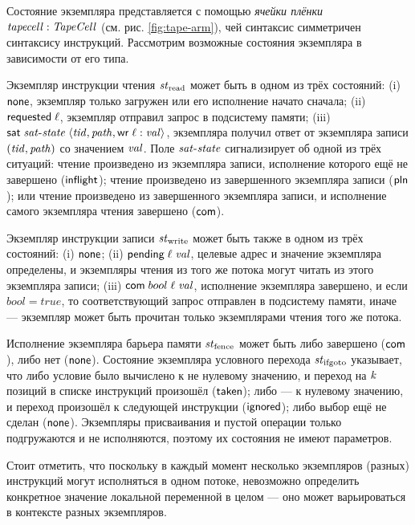 Состояние экземпляра представляется с помощью \emph{ячейки плёнки} $\mathit{tapecell}: \mathit{TapeCell}$ (см. рис. \ref{fig:tape-arm}),
чей синтаксис симметричен синтаксису инструкций. Рассмотрим возможные состояния экземпляра в зависимости от его типа.

Экземпляр инструкции чтения $\mathit{st}_{\textup{\rm read}}$ может быть в одном из трёх состояний:
(i)   $\mathsf{none}$, экземпляр только загружен или его исполнение начато сначала;
(ii)  $\mathsf{requested} \; \ell$, экземпляр отправил запрос в подсистему памяти;
(iii) $\mathsf{sat} \; \mathit{sat\text{-}state} \; \langle \mathit{tid},  \mathit{path}, {\sf wr} \;  \ell:\mathit{val} \rangle$,
      экземпляра получил ответ от экземпляра записи $(\mathit{tid}, \mathit{path})$ со значением $\mathit{val}$.
      Поле $\mathit{sat\text{-}state}$ сигнализирует об одной из трёх ситуаций:
      чтение произведено из экземпляра записи, исполнение которого ещё не завершено
      ($\mathsf{inflight}$);
      чтение произведено из завершенного экземпляра записи ($\mathsf{pln}$); или
      чтение произведено из завершенного экземпляра записи, и исполнение самого
      экземпляра чтения завершено ($\mathsf{com}$).

Экземпляр инструкции записи $\mathit{st}_{\textup{\rm write}}$ может быть также в одном из трёх состояний:
(i)   $\mathsf{none}$;
(ii)  $\textsf{pending} \; \ell \; \mathit{val}$, целевые адрес и значение экземпляра определены,
и экземпляры чтения из того же потока могут читать из этого экземпляра записи;
(iii) $\mathsf{com} \; bool \; \ell \; \mathit{val}$, исполнение экземпляра завершено,
и если $bool = true$, то соответствующий запрос отправлен в подсистему памяти,
иначе --- экземпляр может быть прочитан только экземплярами чтения того же потока.

Исполнение экземпляра барьера памяти $\mathit{st}_{\textup{\rm fence}}$ может быть либо завершено 
($\mathsf{com}$), либо нет ($\mathsf{none}$).
Состояние экземпляра условного перехода $\mathit{st}_{\textup{\rm ifgoto}}$ указывает, что
либо условие было вычислено к не нулевому значению, и переход на $\mathit{k}$ позиций в 
списке инструкций произошёл ($\mathsf{taken}$); либо --- к нулевому значению, и переход произошёл
к следующей инструкции ($\mathsf{ignored}$); либо выбор ещё не сделан ($\mathsf{none}$).
Экземпляры присваивания и пустой операции только подгружаются и не исполняются, поэтому
их состояния не имеют параметров.

Стоит отметить, что поскольку в каждый момент несколько экземпляров
(разных) инструкций могут исполняться в одном потоке, невозможно определить
конкретное значение локальной переменной в целом --- оно может варьироваться в
контексте разных экземпляров.

